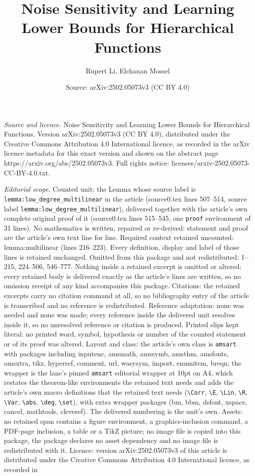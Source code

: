 \documentclass[10pt,a4paper]{amsart}
\title[Noise Sensitivity and Learning Lower Bounds for Hierarchical]{Noise Sensitivity and Learning Lower Bounds for Hierarchical Functions}
\author{Rupert Li, Elchanan Mossel}
\date{Source: arXiv:2502.05073v3 (CC BY 4.0)}
\begin{document}
\maketitle

\noindent\emph{Source and licence.} Noise Sensitivity and Learning Lower Bounds for Hierarchical Functions. Version arXiv:2502.05073v3 (CC BY 4.0), distributed under the Creative Commons Attribution 4.0 International licence, as recorded in the arXiv licence metadata for this exact version and shown on the abstract page https://arxiv.org/abs/2502.05073v3. Full rights notice: licenses/arxiv-2502.05073-CC-BY-4.0.txt.\par\smallskip

\noindent\textit{Editorial scope.} Counted unit: the Lemma whose source label is \texttt{lemma:low\_degree\_multilinear} in the article (source0.tex lines 507--514, source label \texttt{lemma:low\_degree\_multilinear}), delivered together with the article's own complete original proof of it (source0.tex lines 515--545, one \texttt{proof} environment of 31 lines). No mathematics is written, repaired or re-derived: statement and proof are the article's own text line for line. Required context retained uncounted: lemma:multilinear (lines 216--223). Every definition, display and label of those lines is retained unchanged. Omitted from this package and not redistributed: 1--215, 224--506, 546--777. Nothing inside a retained excerpt is omitted or altered: every retained body is delivered exactly as the article's lines are written, so no omission receipt of any kind accompanies this package. Citations: the retained excerpts carry no citation command at all, so no bibliography entry of the article is transcribed and no reference is redistributed. Reference adaptation: none was needed and none was made; every reference inside the delivered unit resolves inside it, so no unresolved reference or citation is produced. Printed slips kept literal: no printed word, symbol, hypothesis or number of the counted statement or of its proof was altered. Layout and class: the article's own class is \texttt{amsart} with packages including inputenc, amsmath, amssymb, amsthm, amsfonts, amsxtra, tikz, hyperref, comment, url, wasysym, import, enumitem, breqn; the wrapper is the lane's pinned \texttt{amsart} editorial wrapper at 10pt on A4, which restates the theorem-like environments the retained text needs and adds the article's own macro definitions that the retained text needs (\texttt{\textbackslash Corr}, \texttt{\textbackslash E}, \texttt{\textbackslash Lin}, \texttt{\textbackslash R}, \texttt{\textbackslash Var}, \texttt{\textbackslash abs}, \texttt{\textbackslash deg}, \texttt{\textbackslash set}), with extra wrapper packages (bm, bbm, dsfont, xspace, cancel, mathtools, cleveref). The delivered numbering is the unit's own. Assets: no retained span contains a figure environment, a graphics-inclusion command, a PDF-page inclusion, a table or a TikZ picture; no image file is copied into this package, the package declares no asset dependency and no image file is redistributed with it. Licence: version arXiv:2502.05073v3 of this article is distributed under the Creative Commons Attribution 4.0 International licence, as recorded in 
\end{document}
